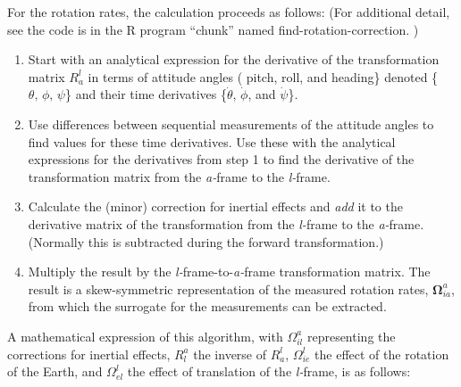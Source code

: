 \documentclass[12pt,twoside,english,12pt,twoside,english]{article}\usepackage[]{graphicx}\usepackage[]{color}
\let\OrgIndex\index
\renewcommand*{\index}[1]{\OrgIndex{#1}}
\begin{document}
For the rotation rates, the calculation proceeds as follows: (For
additional detail, see the code is in the R program ``chunk'' named
find-rotation-correction. )
\begin{enumerate}
\item Start with an analytical expression for the derivative
of the transformation matrix
$R_{a}^{l}$ in terms of attitude angles (
pitch, roll, and heading\} denoted \{$\theta,\,\phi,\,\psi$\} and
their time derivatives \{$\dot{\theta}$,
$\dot{\phi}$, and $\dot{\psi}$\}.
\item Use differences between sequential measurements
of the attitude angles to find values for these time derivatives.
Use these with the analytical expressions for the derivatives from
step 1 to find the derivative of the transformation
matrix from the \emph{a-}frame
to the \emph{l-}frame. 
\item Calculate the (minor) correction for inertial effects
and \emph{add} it to the derivative matrix of the transformation from
the \emph{l-}frame
to the \emph{a-}frame.
(Normally this is subtracted during the forward transformation.)
\item Multiply the result by the \emph{l-}frame-to-\emph{a-}frame
transformation matrix.
The result is a skew-symmetric
representation of the measured
rotation rates, $\boldsymbol{\Omega}_{ia}^{a}$, from
which the surrogate for the measurements can be extracted. 
\end{enumerate}
\vfill\eject

A mathematical expression of this algorithm, with $\Omega_{il}^{a}$ representing the corrections for inertial effects,
$R_{l}^{a}$ the inverse of $R_{a}^{l}$, $\Omega_{ie}^{l}$ the effect
of the rotation of the Earth, and $\Omega_{el}^{l}$ the effect of
translation of the \emph{l-}frame, is as follows:
\end{document}
